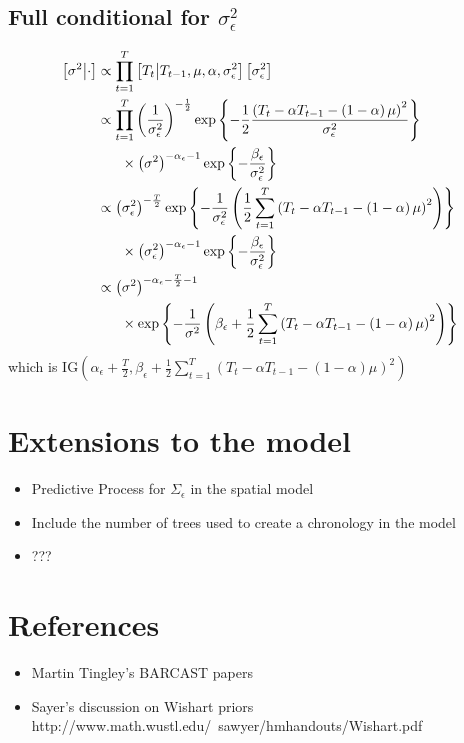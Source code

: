 \documentclass{article}\usepackage[]{graphicx}\usepackage[]{color}
\def\bm#1{\mbox{\boldmath $#1$}}
\begin{document}
\subsection{Full conditional for $\sigma^2_\epsilon$}
%
\begin{align*}
%
\left[ \sigma^2 \middle| \cdot \right] & \propto \prod_{t = 1}^T \left[ T_t \middle| T_{t - 1}, \mu, \alpha, \sigma^2_\epsilon \right] \left[ \sigma^2_\epsilon \right]\\
%
& \propto \prod_{t = 1}^T \left(\frac{1} {\sigma^2_\epsilon} \right)^{ - \frac{1} {2} } \exp{ \left\{ - \frac{1} {2} \frac{\left( T_t  - \alpha T_{t - 1} - \left( 1 - \alpha \right) \mu \right)^2} {\sigma^2_\epsilon} \right\} }\\
& \hspace{6mm} \times \left( \sigma^2 \right)^{ - \alpha_\epsilon - 1} \exp{ \left\{ - \frac{\beta_\epsilon} {\sigma^2_\epsilon} \right\} } \\
%
& \propto \left( \sigma^2_\epsilon \right)^{ - \frac{T} {2} } \exp{ \left\{ - \frac{1} {\sigma^2_\epsilon} \left( \frac{1} {2} \sum_{t = 1}^T \left( T_t  - \alpha T_{t - 1} - \left( 1 - \alpha \right) \mu \right)^2 \right) \right\} }\\
& \hspace{6mm} \times \left( \sigma^2_\epsilon \right)^{ - \alpha_\epsilon - 1} \exp{ \left\{ - \frac{\beta_\epsilon} {\sigma^2_\epsilon} \right\} } \\
%
& \propto \left( \sigma^2 \right)^{ - \alpha_\epsilon - \frac{T} {2} - 1}\\
& \hspace{6mm} \times \exp{ \left\{ - \frac{1} {\sigma^2} \left( \beta_\epsilon + \frac{1} {2} \sum_{t = 1}^T \left( T_t  - \alpha T_{t - 1} - \left( 1 - \alpha \right) \mu \right)^2 \right) \right\} }\\
%
\end{align*}
%
which is IG$\left( \alpha_\epsilon + \frac{T} {2}, \beta_\epsilon + \frac{1} {2} \sum_{t = 1}^T \left( T_t  - \alpha T_{t - 1} - \left( 1 - \alpha \right) \mu \right)^2 \right)$
%
\section{Extensions to the model}
%
\begin{itemize}
%
\item Predictive Process for $\Sigma_\epsilon$ in the spatial model
\item Include the number of trees used to create a chronology in the model
\item ???
%
\end{itemize}
% 
\section{References}
\begin{itemize}
\item Martin Tingley's BARCAST papers
\item  Sayer's discussion on Wishart priors http://www.math.wustl.edu/~sawyer/hmhandouts/Wishart.pdf
\end{itemize}
\end{document}
